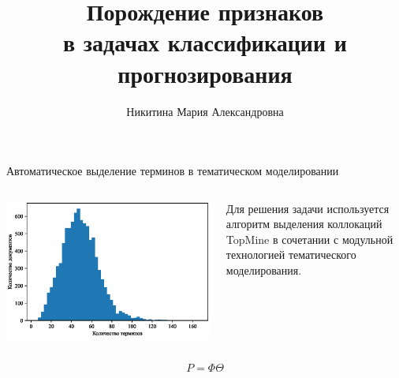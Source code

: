 \documentclass{beamer}
\title[\hbox to 56mm{Порождение признаков}]{Порождение признаков \\ в задачах классификации и прогнозирования}
\author[Н.\,П. Ивкин]{Никитина Мария Александровна}
\institute{Московский физико-технический институт}
\date{\footnotesize
\par\smallskip\emph{Курс:} Автоматизация научных исследований\par (практика, В.\,В.~Стрижов)/Группа 874
\par\smallskip\emph{Эксперт:} О.\,Н.~Петров
\par\smallskip\emph{Консультант:} Ш.\,Л.~Фоменко
\par\bigskip\small 2021}
\begin{document}
\begin{frame}{Автоматическое выделение терминов в тематическом моделировании}
\begin{columns}[c]
\includegraphics[width=1.0\textwidth]{Pictures/Statistics_1.eps}
\begin{small} Для решения задачи используется алгоритм выделения коллокаций TopMine в сочетании с модульной технологией тематического моделирования. \end{small}
    
\end{columns}

\bigskip
\[P = \Phi\Theta\]
\end{frame}
\end{document}
